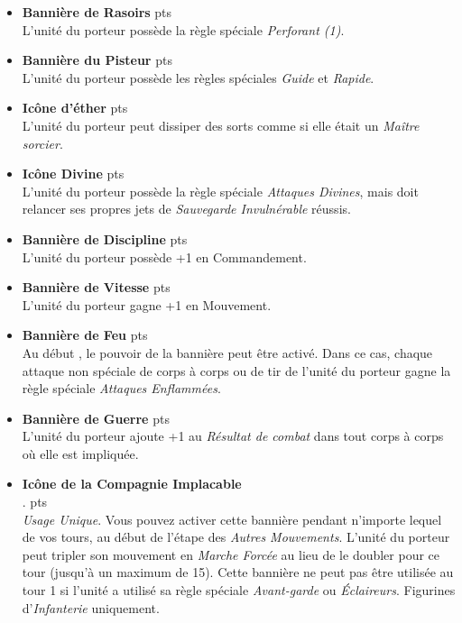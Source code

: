 \begin{multicols}{2}
\begin{itemize}[label={-}]
\item \textbf{Bannière de Rasoirs}  {pts} \\
L'unité du porteur possède la règle spéciale \emph{Perforant (1)}.

\item \textbf{Bannière du Pisteur}  {pts} \\
L'unité du porteur possède les règles spéciales \emph{Guide} et \emph{Rapide}.

\item \textbf{Icône d'éther}  {pts} \\
L'unité du porteur peut dissiper des sorts comme si elle était un \emph{Maître sorcier}.

\item \textbf{Icône Divine}  {pts} \\
L'unité du porteur possède la règle spéciale \emph{Attaques Divines}, mais doit relancer ses propres jets de \emph{Sauvegarde Invulnérable} réussis.

\item \textbf{Bannière de Discipline}  {pts} \\
L'unité du porteur possède +1 en Commandement.

\item \textbf{Bannière de Vitesse}  {pts} \\
L'unité du porteur gagne +1 en Mouvement.

\item \textbf{Bannière de Feu}  {pts} \\
Au début , le pouvoir de la bannière peut être activé. Dans ce cas, chaque attaque non spéciale de corps à corps ou de tir de l'unité du porteur gagne la règle spéciale \emph{Attaques Enflammées}.

\item \textbf{Bannière de Guerre}  {pts} \\
L'unité du porteur ajoute +1 au \emph{Résultat de combat} dans tout corps à corps où elle est impliquée.

\medskip
\item \textbf{Icône de la Compagnie Implacable} \\ . {pts} \\
\emph{Usage Unique}. Vous pouvez activer cette bannière pendant n'importe lequel de vos tours, au début de l'étape des \emph{Autres Mouvements}. L'unité du porteur peut tripler son mouvement en \emph{Marche Forcée} au lieu de le doubler pour ce tour (jusqu'à un maximum de \unit{15}{\pouce}). Cette bannière ne peut pas être utilisée au tour 1 si l'unité a utilisé sa règle spéciale \emph{Avant-garde} ou \emph{Éclaireurs}. Figurines d'\emph{Infanterie} uniquement.


\end{itemize}
\end{multicols}

